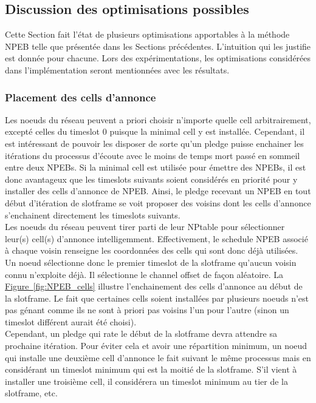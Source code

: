 \documentclass[]{report}
\newcommand{\wordlink}[2]{\hyperref[#2]{#1~\ref{#2}}}
\begin{document}
\subsection{Discussion des optimisations possibles}
\label{optis_NPEB}

Cette Section fait l'état de plusieurs optimisations apportables à la méthode NPEB telle que présentée dans les Sections précédentes. L'intuition qui les justifie est donnée pour chacune. Lors des expérimentations, les optimisations considérées dans l'implémentation seront mentionnées avec les résultats.

\subsubsection{Placement des cells d'annonce}

Les noeuds du réseau peuvent a priori choisir n'importe quelle cell arbitrairement, excepté celles du timeslot 0 puisque la minimal cell y est installée. Cependant, il est intéressant de pouvoir les disposer de sorte qu'un pledge puisse enchainer les itérations du processus d'écoute avec le moins de temps mort passé en sommeil entre deux NPEBs. Si la minimal cell est utilisée pour émettre des NPEBs, il est donc avantageux que les timeslots suivants soient considérés en priorité pour y installer des cells d'annonce de NPEB. Ainsi, le pledge recevant un NPEB en tout début d'itération de slotframe se voit proposer des voisins dont les cells d'annonce s'enchainent directement les timeslots suivants.\\

Les noeuds du réseau peuvent tirer parti de leur NPtable pour sélectionner leur(s) cell(s) d'annonce intelligemment. Effectivement, le schedule NPEB associé à chaque voisin renseigne les coordonnées des cells qui sont donc déjà utilisées. Un noeud sélectionne donc le premier timeslot de la slotframe qu'aucun voisin connu n'exploite déjà. Il sélectionne le channel offset de façon aléatoire. La \wordlink{Figure}{fig:NPEB_cells} illustre l'enchainement des cells d'annonce au début de la slotframe. Le fait que certaines cells soient installées par plusieurs noeuds n'est pas génant comme ils ne sont à priori pas voisins l'un pour l'autre (sinon un timeslot différent aurait été choisi).\\

Cependant, un pledge qui rate le début de la slotframe devra attendre sa prochaine itération. Pour éviter cela et avoir une répartition minimum, un noeud qui installe une deuxième cell d'annonce le fait suivant le même processus mais en considérant un timeslot minimum qui est la moitié de la slotframe. S'il vient à installer une troisième cell, il considérera un timeslot minimum au tier de la slotframe, etc.
\end{document}
